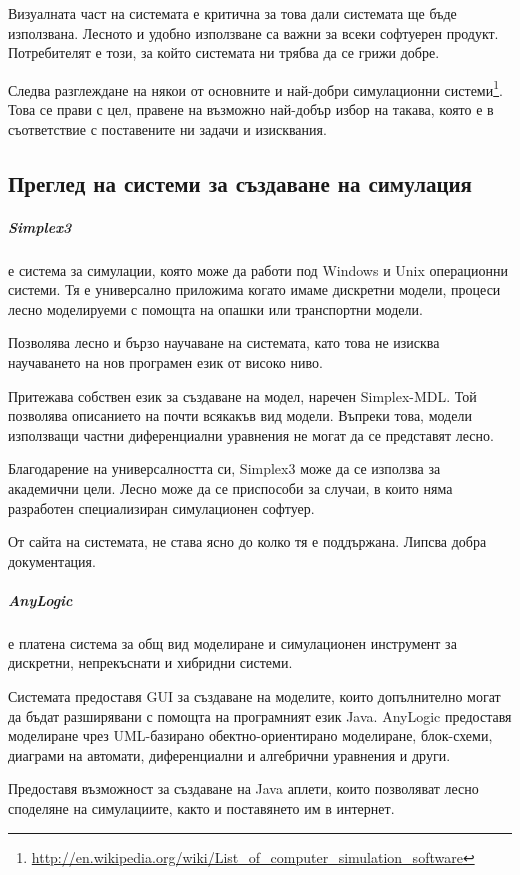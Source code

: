 		Визуалната част на системата е критична за това дали системата ще бъде използвана.
		Лесното и удобно използване са важни за всеки софтуерен продукт. 
		Потребителят е този, за който системата ни трябва да се грижи добре. \cite{Microsoft}
		
		Следва разглеждане на някои от основните и най-добри симулационни 
		системи\footnote{\url{http://en.wikipedia.org/wiki/List_of_computer_simulation_software}}.
		Това се прави с цел, правене на възможно най-добър избор на такава, която е в съответствие
		с поставените ни задачи и изисквания. 
	
	\subsection{Преглед на системи за създаване на симулация}
	
		\subparagraph{Simplex3} е система за симулации, която може да работи под Windows и Unix операционни системи.
			Тя е универсално приложима когато имаме дискретни модели, процеси 
			лесно моделируеми с помощта на опашки или транспортни модели.
						
			Позволява лесно и бързо научаване на системата, като това не изисква
			научаването на нов програмен език от високо ниво.			

			Притежава собствен език за създаване на модел, наречен Simplex-MDL. 
			Той позволява описанието на почти всякакъв вид модели. Въпреки това,
			модели използващи частни диференциални уравнения не могат да се представят
			лесно.
		
			Благодарение на универсалността си, Simplex3 може да се използва за академични цели.
			Лесно може да се приспособи за случаи, в които няма разработен специализиран симулационен
			софтуер. 
		
			От сайта на системата, не става ясно до колко тя е поддържана. 
			Липсва добра документация.\cite{Simplex3}
		
		\subparagraph{AnyLogic} е платена система за общ вид моделиране и симулационен инструмент за 
			дискретни, непрекъснати и хибридни системи.
			
			Системата предоставя \ac{GUI} за създаване на моделите, 
			които допълнително могат да бъдат разширявани с помощта на програмният език Java. 			
			AnyLogic предоставя моделиране чрез UML-базирано обектно-ориентирано моделиране, блок-схеми, 
			диаграми на автомати, диференциални и алгебрични уравнения и други.

				Предоставя възможност за създаване на Java аплети, които позволяват 
			лесно споделяне на симулациите, както и поставянето им в интернет.
	
